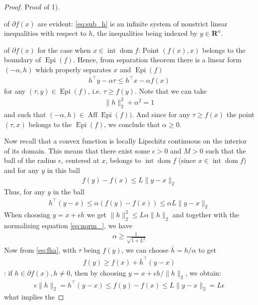 \documentclass{article}
\newcommand{\inte}{\operatorname{int}}
\newcommand{\Aff}{\operatorname{Aff}}
\newcommand{\dom}{\operatorname{dom}}
\newcommand{\Epi}{\operatorname{Epi} }
\begin{document}
\begin{proof}\color{ForestGreen}
Proof of 1).

 of $\partial f(x)$ are evident: \cref{eq:sub_h} is an infinite system of nonstrict linear inequalities with respect to $h$, the inequalities being indexed by $y \in \mathbf{R}^{n}$. 

 of $\partial f(x)$ for the case when $x \in \operatorname{int} \dom f$: Point $(f(x), x)$ belongs to the boundary of  $\Epi (f)$. Hence, from separation theorem there is a linear form $(-\alpha, h)$ which properly separates $x$ and  $\Epi (f)$
\begin{align}
h^{\top} y-\alpha \tau \leq h^{\top} x-\alpha f(x)\label{eq:fha}
\end{align}
for any $(\tau, y) \in \Epi(f)$, i.e. $\tau\ge f(y)$. Note that we can take
\begin{align}
\|h\|_2^{2}+\alpha^{2}=1\label{eq:norm_}
\end{align}
and such that $(-\alpha, h) \in\Aff \Epi (f))$. And since for any $\tau \geq f(x)$ the point $(\tau, x)$ belongs to the $\Epi(f)$, we conclude that $\alpha \geq 0$.

Now recall that a convex function is locally Lipschitz continuous on the interior of its domain. This means that there exist some $\epsilon>0$ and $M>0$ such that the ball of the radius $\epsilon$, centered at $x$, belongs to  $\inte \dom f$ (since $x\in \operatorname{int} \dom f$) and for any $y$ in this ball
\begin{align*}
f(y)-f(x) \leq L\|y-x\|_2
\end{align*}
Thus, for any $y$ in the ball
\begin{align*}
h^{\top}(y-x) \leq \alpha(f(y)-f(x)) \leq \alpha L\|y-x\|_2
\end{align*}
When choosing $y=x+\epsilon h$ we get $\|h\|_2^{2} \leq L \alpha\|h\|_2$ and together with the normalizing equation \cref{eq:norm_}, we have
\begin{align*}
\alpha \geq \frac{1}{\sqrt{1+L^{2}}}
\end{align*}
 Now from \cref{eq:fha}, with $\tau$ being $f(y)$, we can choose $\bar{h}=h / \alpha$ to get
\begin{align*}
f(y) \geq f(x)+\bar{h}^{\top}(y-x)
\end{align*}
: if $h \in \partial f(x), h \neq 0$, then by choosing $y=x+\epsilon h /\|h\|_2$, we obtain:
\begin{align*}
\epsilon\|h\|_2=h^{\top}(y-x) \leq f(y)-f(x) \leq L\|y-x\|_2=L \epsilon
\end{align*}
what implies the 



\end{proof}
\end{document}

